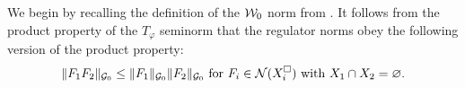 We begin by recalling the definition of the $\mathcal{W}_0$ norm from \cite{BS-rg-step}.
It follows from the product property of the $T_\varphi$ seminorm that the regulator norms
obey the following version of the product property:
\begin{equation}
\|F_1F_2\|_{\mathcal{G}_0} \le   \|F_1\|_{\mathcal{G}_0} \|F_2\|_{\mathcal{G}_0}
\text{ for }
F_i\in \mathcal{N}(X_i^\Box)  \text{ with } X_1 \cap X_2=\varnothing.
\end{equation}

